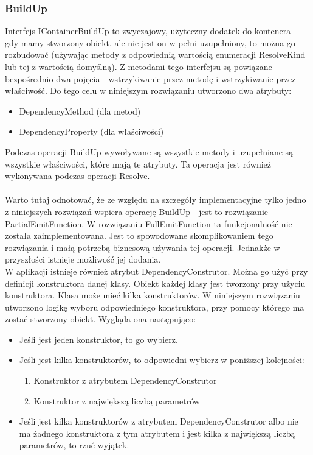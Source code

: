 \documentclass[12pt]{article}
\begin{document}
\subsubsection{BuildUp}
Interfejs IContainerBuildUp to zwyczajowy, użyteczny dodatek do kontenera - gdy mamy stworzony obiekt, ale nie jest on w pełni uzupełniony, to można go rozbudować (używając metody z odpowiednią wartością enumeracji ResolveKind lub tej z wartością domyślną). Z metodami tego interfejsu są powiązane bezpośrednio dwa pojęcia - wstrzykiwanie przez metodę i wstrzykiwanie przez właściwość. Do tego celu w niniejszym rozwiązaniu utworzono dwa atrybuty:
\begin{itemize}
	\item DependencyMethod (dla metod)
	\item DependencyProperty (dla właściwości)
\end{itemize}
Podczas operacji BuildUp wywoływane są wszystkie metody i uzupełniane są wszystkie właściwości, które mają te atrybuty. Ta operacja jest również wykonywana podczas operacji Resolve.\\
\\
Warto tutaj odnotować, że ze względu na szczegóły implementacyjne tylko jedno z niniejszych rozwiązań wspiera operację BuildUp - jest to rozwiązanie PartialEmitFunction. W rozwiązaniu FullEmitFunction ta funkcjonalność nie została zaimplementowana. Jest to spowodowane skomplikowaniem tego rozwiązania i małą potrzebą biznesową używania tej operacji. Jednakże w przyszłości istnieje możliwość jej dodania.\\

W aplikacji istnieje również atrybut DependencyConstrutor. Można go użyć przy definicji konstruktora danej klasy. Obiekt każdej klasy jest tworzony przy użyciu konstruktora. Klasa może mieć kilka konstruktorów. W niniejszym rozwiązaniu utworzono logikę wyboru odpowiedniego konstruktora, przy pomocy którego ma zostać stworzony obiekt. Wygląda ona następująco:
\begin{itemize}
	\item Jeśli jest jeden konstruktor, to go wybierz.
	\item Jeśli jest kilka konstruktorów, to odpowiedni wybierz w poniższej kolejności:
	\begin{enumerate}
		\item Konstruktor z atrybutem DependencyConstrutor
		\item Konstruktor z największą liczbą parametrów
	\end{enumerate}
	\item Jeśli jest kilka konstruktorów z atrybutem DependencyConstrutor albo nie ma żadnego konstruktora z tym atrybutem i jest kilka z największą liczbą parametrów, to rzuć wyjątek.
\end{itemize}
\end{document}
